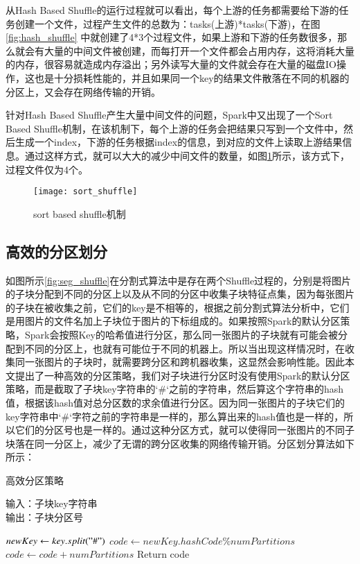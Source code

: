 从Hash Based Shuffle的运行过程就可以看出，每个上游的任务都需要给下游的任务创建一个文件，过程产生文件的总数为：tasks(上游)*tasks(下游)，在图\ref{fig:hash_shuffle} 中就创建了4*3个过程文件，如果上游和下游的任务数很多，那么就会有大量的中间文件被创建，而每打开一个文件都会占用内存，这将消耗大量的内存，很容易就造成内存溢出；另外读写大量的文件就会存在大量的磁盘IO操作，这也是十分损耗性能的，并且如果同一个key的结果文件散落在不同的机器的分区上，又会存在网络传输的开销。

针对Hash Based Shuffle产生大量中间文件的问题，Spark中又出现了一个Sort Based Shuffle机制，在该机制下，每个上游的任务会把结果只写到一个文件中，然后生成一个index，下游的任务根据index的信息，到对应的文件上读取上游结果信息。通过这样方式，就可以大大的减少中间文件的数量，如图\ref{fig:sort_shuffle}所示，该方式下，过程文件仅为4个。
\begin{figure}[htp]
\centering
\texttt{[image: sort\_shuffle]}
\caption{sort based shuffle机制}
\label{fig:sort_shuffle}
\end{figure}

\subsection{高效的分区划分}
如图所示\ref{fig:seg_shuffle}在分割式算法中是存在两个Shuffle过程的，分别是将图片的子块分配到不同的分区上以及从不同的分区中收集子块特征点集，因为每张图片的子块在被收集之前，它们的key是不相等的，根据之前分割式算法分析中，它们是用图片的文件名加上子块位于图片的下标组成的。如果按照Spark的默认分区策略，Spark会按照Key的哈希值进行分区，那么同一张图片的子块就有可能会被分配到不同的分区上，也就有可能位于不同的机器上。所以当出现这样情况时，在收集同一张图片的子块时，就需要跨分区和跨机器收集，这显然会影响性能。因此本文提出了一种高效的分区策略，我们对子块进行分区时没有使用Spark的默认分区策略，而是截取了子块key字符串的`\#`之前的字符串，然后算这个字符串的hash值，根据该hash值对总分区数的求余值进行分区。因为同一张图片的子块它们的key字符串中`\#`字符之前的字符串是一样的，那么算出来的hash值也是一样的，所以它们的分区号也是一样的。通过这种分区方式，就可以使得同一张图片的不同子块落在同一分区上，减少了无谓的跨分区收集的网络传输开销。分区划分算法如下所示：
\begin{algorithm}[htbp]
  \caption{高效分区策略}
  \label{algDiveModel}
  输入：子块key字符串\\
  输出：子块分区号
  \begin{algorithmic}[1]
    \STATE $newKey\leftarrow key.split("\#")$
    \STATE $code\leftarrow newKey.hashCode\%numPartitions$
        \STATE $code\leftarrow code + numPartitions$
    \ENDIF
    \STATE Return code
  \end{algorithmic}
\end{algorithm}

